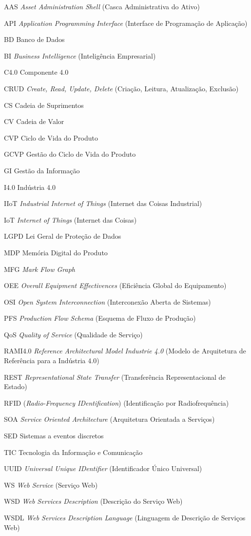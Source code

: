 \begin{siglas}
	\item[AAS] \textit{Asset Administration Shell} (Casca Administrativa do Ativo)
	\item[API] \textit{Application Programming Interface} (Interface de Programação de Aplicação)
	\item[BD] Banco de Dados
	\item[BI] \textit{Business Intelligence} (Inteligência Empresarial)
	\item[C4.0] Componente 4.0
	\item[CRUD] \textit{Create, Read, Update, Delete} (Criação, Leitura, Atualização, Exclusão)
	\item[CS] Cadeia de Suprimentos
	\item[CV] Cadeia de Valor
	\item[CVP] Ciclo de Vida do Produto
	\item[GCVP] Gestão do Ciclo de Vida do Produto
	\item[GI] Gestão da Informação
	\item[I4.0] Indústria 4.0
	\item[IIoT] \textit{Industrial Internet of Things} (Internet das Coisas Industrial)
	\item[IoT] \textit{Internet of Things} (Internet das Coisas)
	\item[LGPD] Lei Geral de Proteção de Dados
	\item[MDP] Memória Digital do Produto
	\item[MFG] \textit{Mark Flow Graph}
	\item[OEE] \textit{Overall Equipment Effectivences} (Eficiência Global do Equipamento)
	\item[OSI] \textit{Open System Interconnection} (Interconexão Aberta de Sistemas)
	\item[PFS] \textit{Production Flow Schema} (Esquema de Fluxo de Produção)
	\item[QoS] \textit{Quality of Service} (Qualidade de Serviço)
	\item[RAMI4.0] \textit{Reference Architectural Model Industrie 4.0} (Modelo de Arquitetura de Referência para a Indústria 4.0)
	\item[REST] \textit{Representational State Transfer} (Transferência Representacional de Estado)
	\item[RFID] (\textit{Radio-Frequency IDentification}) (Identificação por Radiofrequência)
	\item[SOA] \textit{Service Oriented Architecture} (Arquitetura Orientada a Serviços)
	\item[SED] Sistemas a eventos discretos
	\item[TIC] Tecnologia da Informação e Comunicação
	\item[UUID] \textit{Universal Unique IDentifier} (Identificador Único Universal)
	\item[WS] \textit{Web Service} (Serviço Web)
	\item[WSD] \textit{Web Services Description} (Descrição do Serviço Web)
	\item[WSDL] \textit{Web Services Description Language} (Linguagem de Descrição de Serviços Web)
\end{siglas}

\tableofcontents*
\cleardoublepage
